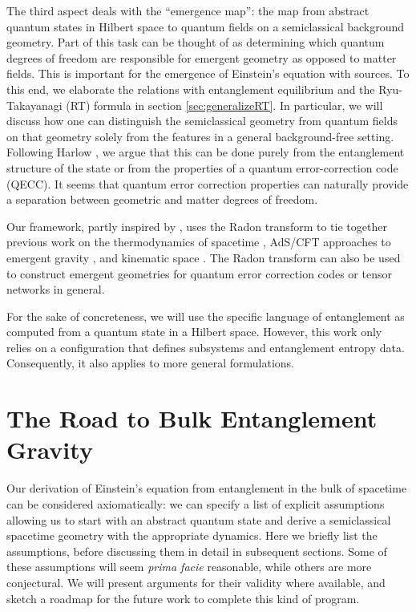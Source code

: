 \documentclass[%
preprint,
nofootinbib,
amsmath,amssymb,
aps,
prd,
showpacs,
superscriptaddress
]{revtex4-1}
\begin{document}
The third aspect deals with the ``emergence map'': the map from abstract quantum states in Hilbert space to quantum fields on a semiclassical background geometry.
Part of this task can be thought of as determining which quantum degrees of freedom are responsible for emergent geometry as opposed to matter fields. This is important for the emergence of Einstein's equation with sources. 
To this end, we elaborate the relations with entanglement equilibrium and the Ryu-Takayanagi (RT) formula in section \ref{sec:generalizeRT}. In particular, we will discuss how one can distinguish the semiclassical geometry from quantum fields on that geometry solely from the features in a general background-free setting. Following Harlow \cite{Harlow:2016vwg}, we argue that this can be done purely from the entanglement structure of the state or from the properties of a quantum error-correction code (QECC). 
It seems that quantum error correction properties can naturally provide a separation between geometric and matter degrees of freedom. 

Our framework, partly inspired by \cite{Czech:2016tqr}, uses the Radon transform to tie together previous work on the thermodynamics of spacetime \cite{Jacobson:1995ab,Jacobson:2015hqa}, AdS/CFT approaches to emergent gravity \cite{Faulkner:2013ica}, and kinematic space \cite{Czech:2015qta}. 
The Radon transform can also be used to construct emergent geometries for quantum error correction codes or tensor networks in general. 

For the sake of concreteness, we will use the specific language of entanglement as computed from a quantum state in a Hilbert space. However, this work only relies on a configuration that defines subsystems and entanglement entropy data. Consequently, it also applies to more general formulations.


\section{The Road to Bulk Entanglement Gravity}

Our derivation of Einstein's equation from entanglement in the bulk of spacetime can be considered axiomatically: we can specify a list of explicit assumptions allowing us to start with an abstract quantum state and derive a semiclassical spacetime geometry with the appropriate dynamics.
Here we briefly list the assumptions, before discussing them in detail in subsequent sections.
Some of these assumptions will seem \emph{prima facie} reasonable, while others are more conjectural.
We will present arguments for their validity where available, and sketch a roadmap for the future work to complete this kind of program.
\end{document}
